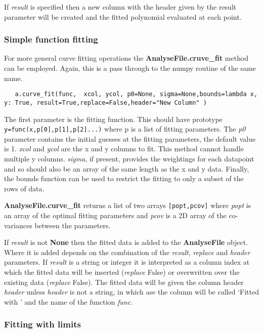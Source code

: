 \documentclass[a4paper,11pt]{scrartcl}
\begin{document}
If \textit{result} is specified then a new column with the header given by the result parameter will be created and the fitted polynomial evaluated at each point.

\subsubsection{Simple function fitting}

For more general curve fitting operations the \textbf{AnalyseFile.cruve\_fit}
method can be employed. Again, this is a pass through to the numpy routine of
the same name.

\begin{lstlisting}
   a.curve_fit(func,  xcol, ycol, p0=None, sigma=None,bounds=lambda x, y: True, result=True,replace=False,header="New Column" )
\end{lstlisting}

The first parameter is the fitting function. This should have prototype
\\\verb:y=func(x,p[0],p[1],p[2]...): where p is a list of fitting parameters.
The \textit{p0} parameter contains the initial guesses at the fitting
parameters, the default value is 1. \textit{xcol} and \textit{ycol} are the x
and y columns to fit. This method cannot handle multiple y columns.
\textit{sigma}, if present, provides the weightings for each datapoint and so
should also be an array of the same length as the x and y data. Finally, the
bounds function can be used to restrict the fitting to only a subset of the rows
of data.

\textbf{AnalyseFile.curve\_fit} returns a list of two arrays \verb:[popt,pcov]:
where \textit{popt} is an array of the optimal fitting parameters and
\textit{pcov} is a 2D array of the co-variances between the parameters.

If \textit{result} is not \textbf{None} then the fitted data is added to the \textbf{AnalyseFile}
object. Where it is added depends on the combination of the \textit{result}, \textit{replace}
and \textit{header} parameters. If \textit{result} is a string or integer it is interpreted as a column
index at which the fitted data will be inserted (\textit{replace} False) or overwritten over the existing data (\textit{replace} False).
The fitted data will be given the column header \textit{header} unless \textit{header} is not a string, in which ase the column
will be called `Fitted with ' and the name of the function \textit{func}.


\subsubsection{Fitting with limits}
\end{document}
